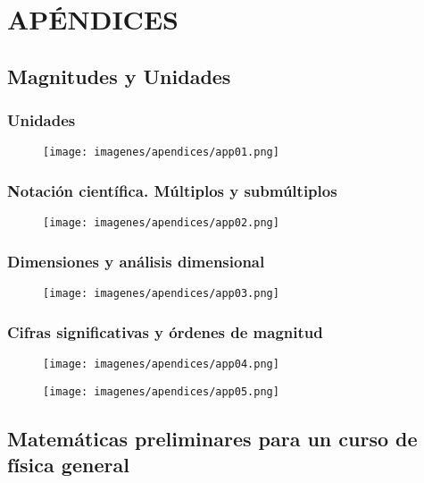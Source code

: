 \part{APÉNDICES}

\chapter{Magnitudes y Unidades} 
\section{Unidades}
\begin{figure}[H]
		\centering
		\texttt{[image: imagenes/apendices/app01.png]}
\end{figure}
\section{Notación científica. Múltiplos y submúltiplos}
\vspace{-5mm}\begin{figure}[H]
		\centering
		\texttt{[image: imagenes/apendices/app02.png]}
\end{figure}
\vspace{-5mm}\section{Dimensiones y análisis dimensional}
\vspace{-5mm}\begin{figure}[H]
		\centering
		\texttt{[image: imagenes/apendices/app03.png]}
\end{figure}
\vspace{-5mm}\section{Cifras significativas y órdenes de magnitud}
\vspace{-5mm}\begin{figure}[H]
		\centering
		\texttt{[image: imagenes/apendices/app04.png]}
\end{figure}
\vspace{-5mm}\begin{figure}[H]
		\centering
		\texttt{[image: imagenes/apendices/app05.png]}
\end{figure}


\chapter{Matemáticas preliminares para un curso de física general}

